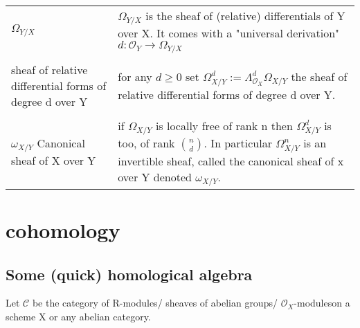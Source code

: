 \documentclass[a4paper, 12pt]{article}
\newcommand{\ca}[1]{\mathcal{#1}}
\newcommand{\oxmods}{$\mathcal{O}_X$-modules}
\newcommand{\ox}{\mathcal{O}_X}
\newcommand{\oy}{\mathcal{O}_Y}
\begin{document}
\begin{longtable}{p{}  p{} } 
	$\Omega_{Y/X}$ & $\Omega_{Y/X}$ is the sheaf of (relative) differentials of Y over X.  It comes with a "universal derivation"  $d:\oy \longrightarrow \Omega_{Y/X}$\\
	
	&\\
	
	sheaf of relative differential forms of degree d over Y & for any $d \geq 0$ set $\Omega_{X/Y}^d := \Lambda^d_{\ox} \Omega_{X/Y}$ the sheaf of relative differential forms of degree d over Y.\\
	
	&\\
	
	$\omega_{X/Y}$ Canonical sheaf of X over Y & if $\Omega_{X/Y}$ is locally free of rank n then $\Omega_{X/Y}^d$ is too, of rank $n\choose d$. In particular $\Omega_{X/Y}^n$ is an invertible sheaf, called the canonical sheaf of x over Y denoted $\omega_{X/Y}$.
	
	&\\
	
	
	
\end{longtable}

\section{cohomology}

\subsection{Some (quick) homological algebra}

Let $ \ca{C} $ be the category of R-modules/ sheaves of abelian groups/ \oxmods on a scheme X or any abelian category.
\end{document}
